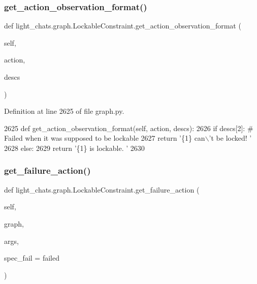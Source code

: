 \subsubsection{\texorpdfstring{get\+\_\+action\+\_\+observation\+\_\+format()}{get\_action\_observation\_format()}}
{\footnotesize\ttfamily def light\+\_\+chats.\+graph.\+Lockable\+Constraint.\+get\+\_\+action\+\_\+observation\+\_\+format (\begin{DoxyParamCaption}\item[{}]{self,  }\item[{}]{action,  }\item[{}]{descs }\end{DoxyParamCaption})}



Definition at line 2625 of file graph.\+py.


\begin{DoxyCode}
2625     \textcolor{keyword}{def }get\_action\_observation\_format(self, action, descs):
2626         \textcolor{keywordflow}{if} descs[2]:  \textcolor{comment}{# Failed when it was supposed to be lockable}
2627             \textcolor{keywordflow}{return} \textcolor{stringliteral}{'\{1\} can\(\backslash\)'t be locked! '}
2628         \textcolor{keywordflow}{else}:
2629             \textcolor{keywordflow}{return} \textcolor{stringliteral}{'\{1\} is lockable. '}
2630 
\end{DoxyCode}
\mbox{\label{classlight__chats_1_1graph_1_1LockableConstraint_a54fa507fa6b123fa5e818b48ab5bf207}} 
\subsubsection{\texorpdfstring{get\+\_\+failure\+\_\+action()}{get\_failure\_action()}}
{\footnotesize\ttfamily def light\+\_\+chats.\+graph.\+Lockable\+Constraint.\+get\+\_\+failure\+\_\+action (\begin{DoxyParamCaption}\item[{}]{self,  }\item[{}]{graph,  }\item[{}]{args,  }\item[{}]{spec\+\_\+fail = {\ttfamily \textquotesingle{}failed\textquotesingle{}} }\end{DoxyParamCaption})}



